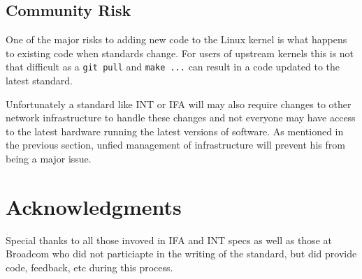 \documentclass[letterpaper,twocolumn,10pt]{article}
\begin{document}
\subsection{Community Risk}

One of the major risks to adding new code to the Linux kernel is what
happens to existing code when standards change.  For users of upstream
kernels this is not that difficult as a \texttt{git pull} and
\texttt{make ...} can result in a code updated to the latest standard.

Unfortunately a standard like INT or IFA will may also require changes
to other network infrastructure to handle these changes and not everyone
may have access to the latest hardware running the latest versions of
software.  As mentioned in the previous section, unfied management of
infrastructure will prevent his from being a major issue.

\section{Acknowledgments}

Special thanks to all those invoved in IFA and INT specs as well as
those at Broadcom who did not particiapte in the writing of the
standard, but did provide code, feedback, etc during this process.

{\normalsize 
}

\theendnotes
\end{document}
